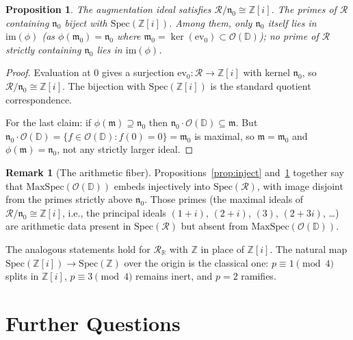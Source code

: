\documentclass{amsart}
\newtheorem{proposition}[theorem]{Proposition}
\theoremstyle{definition}
\newtheorem{remark}[theorem]{Remark}
\newcommand{\D}{\mathbb{D}}
\newcommand{\Z}{\mathbb{Z}}
\newcommand{\Zi}{\mathbb{Z}[i]}
\newcommand{\OD}{\mathcal{O}(\D)}
\newcommand{\mR}{\mathcal{R}}
\newcommand{\mRR}{\mathcal{R}_{\mathbb{R}}}
\begin{document}
\begin{proposition}
\label{prop:fiber}
The augmentation ideal satisfies $\mR/\mathfrak{n}_0 \cong \Zi$.  The
primes of $\mR$ containing $\mathfrak{n}_0$ biject with
$\mathrm{Spec}(\Zi)$.  Among them, only $\mathfrak{n}_0$ itself lies
in $\mathrm{im}(\phi)$ (as $\phi(\mathfrak{m}_0) = \mathfrak{n}_0$
where $\mathfrak{m}_0 = \ker(\mathrm{ev}_0) \subset \OD$); no prime
of $\mR$ strictly containing $\mathfrak{n}_0$ lies in $\mathrm{im}(\phi)$.
\end{proposition}

\begin{proof}
Evaluation at $0$ gives a surjection $\mathrm{ev}_0\colon\mR \to \Zi$
with kernel $\mathfrak{n}_0$, so $\mR/\mathfrak{n}_0 \cong \Zi$.  The
bijection with $\mathrm{Spec}(\Zi)$ is the standard quotient correspondence.

For the last claim: if $\phi(\mathfrak{m}) \supseteq \mathfrak{n}_0$
then $\mathfrak{n}_0 \cdot \OD \subseteq \mathfrak{m}$.  But
$\mathfrak{n}_0 \cdot \OD = \{f \in \OD : f(0)=0\} = \mathfrak{m}_0$
is maximal, so $\mathfrak{m} = \mathfrak{m}_0$ and
$\phi(\mathfrak{m}) = \mathfrak{n}_0$, not any strictly larger ideal.
\end{proof}

\begin{remark}[The arithmetic fiber]
\label{rem:fiber}
Propositions~\ref{prop:inject} and~\ref{prop:fiber} together say that
$\mathrm{MaxSpec}(\OD)$ embeds injectively into $\mathrm{Spec}(\mR)$,
with image disjoint from the primes strictly above $\mathfrak{n}_0$.
Those primes (the maximal ideals of $\mR/\mathfrak{n}_0 \cong \Zi$,
i.e., the principal ideals $(1+i)$, $(2+i)$, $(3)$, $(2+3i)$, \ldots)
are arithmetic data present in $\mathrm{Spec}(\mR)$ but absent from
$\mathrm{MaxSpec}(\OD)$.

The analogous statements hold for $\mRR$ with $\Z$ in place of $\Zi$.
The natural map $\mathrm{Spec}(\Zi) \to \mathrm{Spec}(\Z)$ over the
origin is the classical one: $p \equiv 1 \pmod{4}$ splits in $\Zi$,
$p \equiv 3 \pmod{4}$ remains inert, and $p=2$ ramifies.
\end{remark}

\section{Further Questions}
\label{sec:open}
\end{document}
